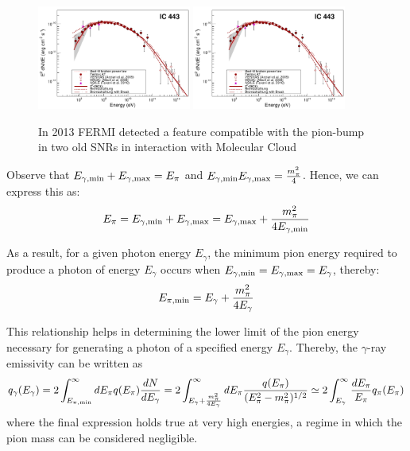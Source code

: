 \begin{figure}[!t]
\centering
\includegraphics[width=0.45\textwidth]{figures/1231160fig2a.pdf}
\includegraphics[width=0.45\textwidth]{figures/1231160fig2a.pdf}
\caption{In 2013 FERMI detected a feature compatible with the pion-bump in two old SNRs in interaction with Molecular Cloud~\cite{Ackermann2013sci}}
\end{figure}

Observe that \( E_{\rm \gamma, min} + E_{\rm \gamma, max} = E_\pi \) and \( E_{\rm \gamma, min} E_{\rm \gamma, max} = \frac{m_\pi^2}{4} \). Hence, we can express this as:
%
\begin{equation}
E_\pi = E_{\rm \gamma, min} + E_{\rm \gamma, max} = E_{\rm \gamma, max} + \frac{m_\pi^2}{4E_{\rm \gamma, min}}
\end{equation}

As a result, for a given photon energy \( E_\gamma \), the minimum pion energy required to produce a photon of energy \( E_\gamma \) occurs when \( E_{\rm \gamma,min} = E_{\rm \gamma,max} = E_\gamma \), thereby:
%
\begin{equation}
E_{\rm \pi, min} = E_\gamma + \frac{m_\pi^2}{4 E_\gamma}
\end{equation}

This relationship helps in determining the lower limit of the pion energy necessary for generating a photon of a specified energy \( E_\gamma \). Thereby, the $\gamma$-ray emissivity can be written as
%
\begin{equation}
q_\gamma(E_\gamma) = 2 \int_{E_{\rm \pi, min}}^\infty dE_\pi q(E_\pi) \frac{dN}{dE_\gamma} = 
2 \int_{E_\gamma + \frac{m_\pi^2}{4 E_\gamma}}^\infty dE_\pi \frac{q(E_\pi)}{(E_\pi^2 - m_\pi^2)^{1/2}} \simeq 2 \int_{E_\gamma}^\infty \frac{dE_\pi}{E_\pi} q_\pi(E_\pi)
\end{equation}
%
where the final expression holds true at very high energies, a regime in which the pion mass can be considered negligible.

